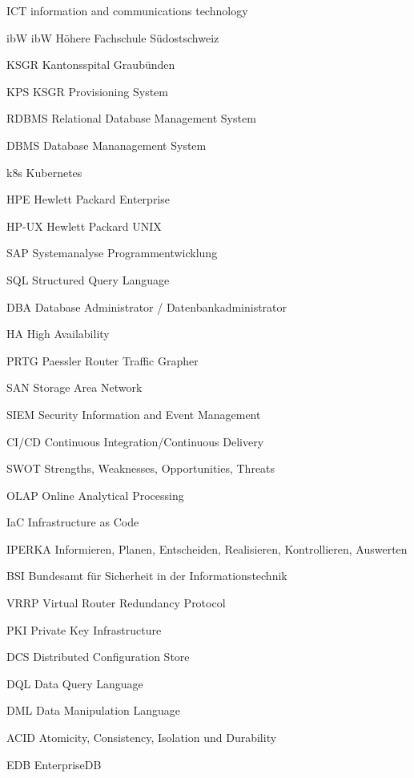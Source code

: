 
\begin{abkuerzungen}[MUSTER] %
    \item[ICT] information and communications technology
    \item[ibW] ibW Höhere Fachschule Südostschweiz
    \item[KSGR] Kantonsspital Graubünden
    \item[KPS] KSGR Provisioning System
    \item[\Gls{RDBMS}] Relational Database Management System
    \item[\Gls{DBMS}] Database Mananagement System
    \item[k8s] \Gls{Kubernetes}
    \item[HPE] Hewlett Packard Enterprise
    \item[\Gls{HP-UX}] Hewlett Packard \Gls{UNIX}
    \item[SAP] Systemanalyse Programmentwicklung
    \item[SQL] Structured Query Language
    \item[DBA] Database Administrator / Datenbankadministrator
    \item[HA] High Availability
    \item[\Gls{PRTG}] Paessler Router Traffic Grapher
    \item[\Gls{SAN}] Storage Area Network
    \item[\Gls{SIEM}] Security Information and Event Management
    \item[\Gls{CI/CD}] Continuous Integration/Continuous Delivery
    \item[\Gls{SWOT}] Strengths, Weaknesses, Opportunities, Threats
    \item[\Gls{OLAP}] Online Analytical Processing
    \item[IaC] Infrastructure as Code
    \item[IPERKA] Informieren, Planen, Entscheiden, Realisieren, Kontrollieren, Auswerten
    \item[BSI] Bundesamt für Sicherheit in der Informationstechnik
    \item[\Gls{VRRP}] Virtual Router Redundancy Protocol
    \item[\Gls{PKI}] Private Key Infrastructure
    \item[\Gls{DCS}] Distributed Configuration Store
    \item[DQL] Data Query Language
    \item[DML] Data Manipulation Language
    \item[ACID] Atomicity, Consistency, Isolation und Durability
    \item[EDB] EnterpriseDB
\end{abkuerzungen}